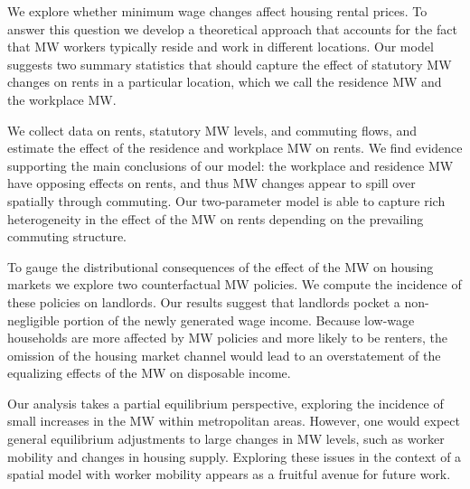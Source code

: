 
We explore whether minimum wage changes affect housing rental prices.
To answer this question we develop a theoretical approach that accounts for
the fact that MW workers typically reside and work in different locations.
Our model suggests two summary statistics that should capture the effect of 
statutory MW changes on rents in a particular location, which we call the 
residence MW and the workplace MW.

We collect data on rents, statutory MW levels, and commuting flows, and estimate 
the effect of the residence and workplace MW on rents.
We find evidence supporting the main conclusions of our model: the workplace and 
residence MW have opposing effects on rents, and thus MW changes appear to 
spill over spatially through commuting.
Our two-parameter model is able to capture rich heterogeneity in the effect 
of the MW on rents depending on the prevailing commuting structure.

To gauge the distributional consequences of the effect of the MW on 
housing markets we explore two counterfactual MW policies.
We compute the incidence of these policies on landlords.
Our results suggest that landlords pocket a non-negligible portion of the newly 
generated wage income.
Because low-wage households are more affected by MW policies and more likely to 
be renters,
the omission of the housing market channel would lead to an overstatement of the 
equalizing effects of the MW on disposable income.

Our analysis takes a partial equilibrium perspective, exploring the incidence 
of small increases in the MW within metropolitan areas.
However, one would expect general equilibrium adjustments to large changes 
in MW levels, such as worker mobility and changes in housing supply.
Exploring these issues in the context of a spatial model with worker mobility 
appears as a fruitful avenue for future work.
